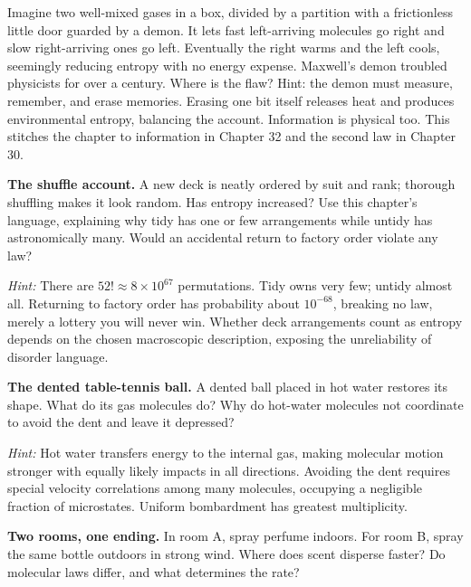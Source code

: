 \begin{thought}
Imagine two well-mixed gases in a box, divided by a partition with a frictionless little door guarded by a demon. It lets fast left-arriving molecules go right and slow right-arriving ones go left. Eventually the right warms and the left cools, seemingly reducing entropy with no energy expense. Maxwell's demon troubled physicists for over a century. Where is the flaw? Hint: the demon must measure, remember, and erase memories. Erasing one bit itself releases heat and produces environmental entropy, balancing the account. Information is physical too. This stitches the chapter to information in Chapter 32 and the second law in Chapter 30.
\end{thought}

\begin{puzzles}
\item \textbf{The shuffle account.} A new deck is neatly ordered by suit and rank; thorough shuffling makes it look random. Has entropy increased? Use this chapter's language, explaining why tidy has one or few arrangements while untidy has astronomically many. Would an accidental return to factory order violate any law?

  \textit{Hint:} There are \(52!\approx 8\times10^{67}\) permutations. Tidy owns very few; untidy almost all. Returning to factory order has probability about \(10^{-68}\), breaking no law, merely a lottery you will never win. Whether deck arrangements count as entropy depends on the chosen macroscopic description, exposing the unreliability of disorder language.

\item \textbf{The dented table-tennis ball.} A dented ball placed in hot water restores its shape. What do its gas molecules do? Why do hot-water molecules not coordinate to avoid the dent and leave it depressed?

  \textit{Hint:} Hot water transfers energy to the internal gas, making molecular motion stronger with equally likely impacts in all directions. Avoiding the dent requires special velocity correlations among many molecules, occupying a negligible fraction of microstates. Uniform bombardment has greatest multiplicity.

\item \textbf{Two rooms, one ending.} In room A, spray perfume indoors. For room B, spray the same bottle outdoors in strong wind. Where does scent disperse faster? Do molecular laws differ, and what determines the rate?


\end{puzzles}
